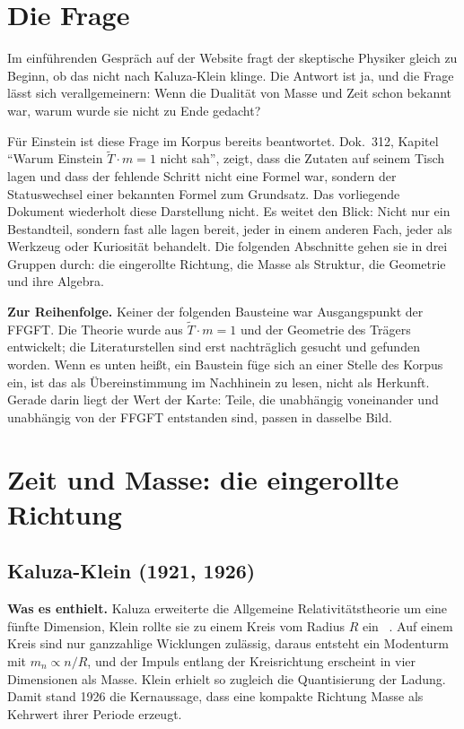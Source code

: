 \section{Die Frage}

Im einführenden Gespräch auf der Website fragt der skeptische Physiker gleich zu Beginn, ob das
nicht nach Kaluza-Klein klinge. Die Antwort ist ja, und die Frage lässt sich verallgemeinern: Wenn
die Dualität von Masse und Zeit schon bekannt war, warum wurde sie nicht zu Ende gedacht?

Für Einstein ist diese Frage im Korpus bereits beantwortet. Dok.~312, Kapitel \enquote{Warum
Einstein $\tilde T\cdot m=1$ nicht sah}, zeigt, dass die Zutaten auf seinem Tisch lagen und dass
der fehlende Schritt nicht eine Formel war, sondern der Statuswechsel einer bekannten Formel zum
Grundsatz. Das vorliegende Dokument wiederholt diese Darstellung nicht. Es weitet den Blick: Nicht
nur ein Bestandteil, sondern fast alle lagen bereit, jeder in einem anderen Fach, jeder als
Werkzeug oder Kuriosität behandelt. Die folgenden Abschnitte gehen sie in drei Gruppen durch: die
eingerollte Richtung, die Masse als Struktur, die Geometrie und ihre Algebra.

\textbf{Zur Reihenfolge.} Keiner der folgenden Bausteine war Ausgangspunkt der FFGFT. Die Theorie
wurde aus $\tilde T\cdot m=1$ und der Geometrie des Trägers entwickelt; die Literaturstellen sind
erst nachträglich gesucht und gefunden worden. Wenn es unten heißt, ein Baustein füge sich an einer
Stelle des Korpus ein, ist das als Übereinstimmung im Nachhinein zu lesen, nicht als Herkunft. Gerade
darin liegt der Wert der Karte: Teile, die unabhängig voneinander und unabhängig von der FFGFT
entstanden sind, passen in dasselbe Bild.

\section{Zeit und Masse: die eingerollte Richtung}

\subsection{Kaluza-Klein (1921, 1926)}

\textbf{Was es enthielt.} Kaluza erweiterte die Allgemeine Relativitätstheorie um eine fünfte
Dimension, Klein rollte sie zu einem Kreis vom Radius $R$ ein \QM~\cite{Kaluza1921,Klein1926}. Auf
einem Kreis sind nur ganzzahlige Wicklungen zulässig, daraus entsteht ein Modenturm mit
$m_n\propto n/R$, und der Impuls entlang der Kreisrichtung erscheint in vier Dimensionen als
Masse. Klein erhielt so zugleich die Quantisierung der Ladung. Damit stand 1926 die Kernaussage,
dass eine kompakte Richtung Masse als Kehrwert ihrer Periode erzeugt.

